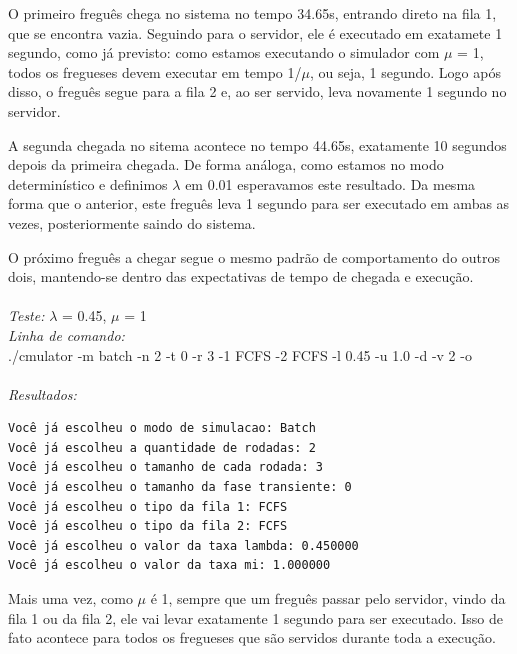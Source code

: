 \documentclass[a4paper,10pt]{article}
\begin{document}
O primeiro freguês chega no sistema no tempo 34.65s, entrando direto na fila 1, que se encontra vazia. Seguindo para o servidor, ele é executado em exatamete 1 segundo, como já previsto: como estamos executando o simulador com $\mu$ = 1, todos os fregueses devem executar em tempo 1/$\mu$, ou seja, 1 segundo. Logo após disso, o freguês segue para a fila 2 e, ao ser servido, leva novamente 1 segundo no servidor. 

A segunda chegada no sitema acontece no tempo 44.65s, exatamente 10 segundos depois da primeira chegada. De forma análoga, como estamos no modo determinístico e definimos $\lambda$ em 0.01 esperavamos este resultado. Da mesma forma que o anterior, este freguês leva 1 segundo para ser executado em ambas as vezes, posteriormente saindo do sistema.

O próximo freguês a chegar segue o mesmo padrão de comportamento do outros dois, mantendo-se dentro das expectativas de tempo de chegada e execução.
\\
\\
\emph{Teste:} $\lambda$ = 0.45, $\mu$ = 1
\\
\emph{Linha de comando:}
\\
./cmulator -m batch -n 2 -t 0 -r 3 -1 FCFS -2 FCFS -l 0.45 -u 1.0 -d -v 2 -o
\\
\\
\emph{Resultados:}
\\\begin{verbatim}
Você já escolheu o modo de simulacao: Batch
Você já escolheu a quantidade de rodadas: 2
Você já escolheu o tamanho de cada rodada: 3
Você já escolheu o tamanho da fase transiente: 0
Você já escolheu o tipo da fila 1: FCFS
Você já escolheu o tipo da fila 2: FCFS
Você já escolheu o valor da taxa lambda: 0.450000
Você já escolheu o valor da taxa mi: 1.000000
\end{verbatim}

    Mais uma vez, como $\mu$ é 1, sempre que um freguês passar pelo servidor, vindo da fila 1 ou da fila 2, ele vai levar exatamente 1 segundo para ser executado. Isso de fato acontece para todos os fregueses que são servidos durante toda a execução.
\end{document}
